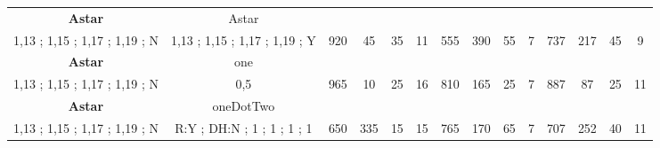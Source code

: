 \begin{table}[H]
{\begin{tabular}{|c|c|c|c|c|c|c|c|c|c|c|c|c|c|}
\cellcolor{blue!15}\textbf{Astar} & Astar& {\color[HTML]{00009B} } & {\color[HTML]{9A0000} } & {\color[HTML]{009901} } &  & {\color[HTML]{00009B} } & {\color[HTML]{9A0000} } & {\color[HTML]{009901} } &  & {\color[HTML]{00009B} } & {\color[HTML]{9A0000} } & {\color[HTML]{009901} } &  \\ 
\cellcolor{ blue!15}1,13 ; 1,15 ; 1,17 ; 1,19 ; N & 1,13 ; 1,15 ; 1,17 ; 1,19 ; Y & \multirow{-2}{*}{{\color[HTML]{00009B} 920}} & \multirow{-2}{*}{{\color[HTML]{9A0000} 45}} & \multirow{-2}{*}{{\color[HTML]{009901} 35}} & \multirow{-2}{*}{11} & \multirow{-2}{*}{{\color[HTML]{00009B} 555}} & \multirow{-2}{*}{{\color[HTML]{9A0000} 390}} & \multirow{-2}{*}{{\color[HTML]{009901} 55}} & \multirow{-2}{*}{7} & \multirow{-2}{*}{{\color[HTML]{00009B} 737}} & \multirow{-2}{*}{{\color[HTML]{9A0000} 217}} & \multirow{-2}{*}{{\color[HTML]{009901} 45}} & \multirow{-2}{*}{9} \\ \hline

\cellcolor{blue!15}\textbf{Astar} & one& {\color[HTML]{00009B} } & {\color[HTML]{9A0000} } & {\color[HTML]{009901} } &  & {\color[HTML]{00009B} } & {\color[HTML]{9A0000} } & {\color[HTML]{009901} } &  & {\color[HTML]{00009B} } & {\color[HTML]{9A0000} } & {\color[HTML]{009901} } &  \\ 
\cellcolor{ blue!15}1,13 ; 1,15 ; 1,17 ; 1,19 ; N & 0,5 & \multirow{-2}{*}{{\color[HTML]{00009B} 965}} & \multirow{-2}{*}{{\color[HTML]{9A0000} 10}} & \multirow{-2}{*}{{\color[HTML]{009901} 25}} & \multirow{-2}{*}{16} & \multirow{-2}{*}{{\color[HTML]{00009B} 810}} & \multirow{-2}{*}{{\color[HTML]{9A0000} 165}} & \multirow{-2}{*}{{\color[HTML]{009901} 25}} & \multirow{-2}{*}{7} & \multirow{-2}{*}{{\color[HTML]{00009B} 887}} & \multirow{-2}{*}{{\color[HTML]{9A0000} 87}} & \multirow{-2}{*}{{\color[HTML]{009901} 25}} & \multirow{-2}{*}{11} \\ \hline

\cellcolor{blue!15}\textbf{Astar} & oneDotTwo& {\color[HTML]{00009B} } & {\color[HTML]{9A0000} } & {\color[HTML]{009901} } &  & {\color[HTML]{00009B} } & {\color[HTML]{9A0000} } & {\color[HTML]{009901} } &  & {\color[HTML]{00009B} } & {\color[HTML]{9A0000} } & {\color[HTML]{009901} } &  \\ 
\cellcolor{ blue!15}1,13 ; 1,15 ; 1,17 ; 1,19 ; N & R:Y ; DH:N ; 1 ; 1 ; 1 ; 1 & \multirow{-2}{*}{{\color[HTML]{00009B} 650}} & \multirow{-2}{*}{{\color[HTML]{9A0000} 335}} & \multirow{-2}{*}{{\color[HTML]{009901} 15}} & \multirow{-2}{*}{15} & \multirow{-2}{*}{{\color[HTML]{00009B} 765}} & \multirow{-2}{*}{{\color[HTML]{9A0000} 170}} & \multirow{-2}{*}{{\color[HTML]{009901} 65}} & \multirow{-2}{*}{7} & \multirow{-2}{*}{{\color[HTML]{00009B} 707}} & \multirow{-2}{*}{{\color[HTML]{9A0000} 252}} & \multirow{-2}{*}{{\color[HTML]{009901} 40}} & \multirow{-2}{*}{11} \\ \hline


\end{tabular}}
\end{table}
